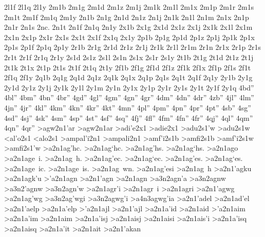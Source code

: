 {2l1f
2l1q
2l1y
%
2m1b
2m1g
2m1d
2m1z
2m1j
2m1k
2m1l
2m1x
2m1p
2m1r
2m1s
2m1t
2m1f
2m1q
2m1y
%
2n1b
2n1g
2n1d
2n1z
2n1j
2n1k
2n1l
2n1m
2n1x
2n1p
2n1r
2n1s
2nc.
2n1t
2n1f
2n1q
2n1y
%
2x1b
2x1g
2x1d
2x1z
2x1j
2x1k
2x1l
2x1m
2x1n
2x1p
2x1r
2x1s
2x1t
2x1f
2x1q
2x1y
%
2p1b
2p1g
2p1d
2p1z
2p1j
2p1k
2p1x
2p1s
2p1f
2p1q
2p1y
%
2r1b
2r1g
2r1d
2r1z
2r1j
2r1k
2r1l
2r1m
2r1n
2r1x
2r1p
2r1s
2r1t
2r1f
2r1q
2r1y
%
2s1d   %
2s1z
2s1l
2s1n
2s1x
2s1r
2s1y
%
2t1b
2t1g
2t1d
2t1z
2t1j
2t1k
2t1x
2t1p
2t1s
2t1f
2t1q
2t1y
%
2f1b
2f1g
2f1d
2f1z
2f1k
2f1x
2f1p
2f1s
2f1t
2f1q
2f1y
%
2q1b
2q1g
2q1d
2q1z
2q1k
2q1x
2q1p
2q1s
2q1t
2q1f
2q1y
%
2y1b
2y1g
2y1d
2y1z
2y1j
2y1k
2y1l
2y1m
2y1n
2y1x
2y1p
2y1r
2y1s
2y1t
2y1f
2y1q
4bd''
4bl''
4bm''
4bn''
4br''
%
4gd''
4gl''
4gm''
4gn''
4gr''
%
4dm''
4dn''
4dr''
%
4zb''
%
4jl''
4lm''
4jn''
4jr''
%
4kl''
4km''
4kn''
4kr''
4kt''
%
4mn''
%
4pl''
4pm''
4pn''
4pr''
4pt''
%
4sb''
4sg''
4sd''
4sj''
4sk''
4sm''
4sp''
4st''
4sf''
4sq''
%
4fj''
4fl''
4fm''
4fn''
4fr''
%
4qj''
4ql''
4qm''
4qn''
4qr''
%
>agw2n1'ar  %
>agw2n1ar
>adi'e2x1 		%
>adie2x1
>adu2s1'w 		%
>adu2s1w
<al'o2s1    		%
<alo2s1
>ampal'i2n1 		%
>ampali2n1
>amf'i2s1b 		%
>amfi2s1b
>amf'i2s1w 		%
>amfi2s1'w
>a2n1ag'hc. 		%
>a2n1ag`hc.
>a2n1ag'hs.
>a2n1ag`hs.
>a2n1ago
>a2n1age~i.
>a2n1ag~h.
>a2n1ag'ec.
>a2n1ag`ec.
>a2n1ag'es.
>a2n1ag`es.
>a2n1age~ic.
>a2n1age~is.
>a2n1ag~wn.
>a2n1ag'esi
>a2n1ag~h 
>a2n1'agku 		%
>a2n1agk'u
>'a2n1agn  		%
>a2n1'agn 
>a2n1agn   		%
	>a3n2agn'a 		%
	>a3n2agnw  		%
	>a3n2'agnw 		%
	>a3n2agn'w 
>a2n1agr'i 		%
>a2n1agr~i 		%
>a2n1agri   		%
>a2n1'agwg 		%
>a2n1ag'wg
	>a3n2ag'wgi   		%
	>a3n2agwg'i
		>a4n3agwg'ia 		%
>a2n1'adel 		%
>a2n1ad'el
>a2n1'aelp  		%
>a2n1a'elp
>'a2n1ajl  		%
>a2n1'ajl
>a2n1a'id  		%
>a2n1aid   		%
>'a2n1aim  		%
>a2n1a'im
>a2n1aim   		%
>a2n1a'isj 		%
>a2n1aisj
>a2n1aisi  		%
>a2n1ais'i
>a2n1a'isq  		%
>a2n1aisq
>a2n1a'it 		%
>a2n1ait
>a2n1'akan 		%
}
